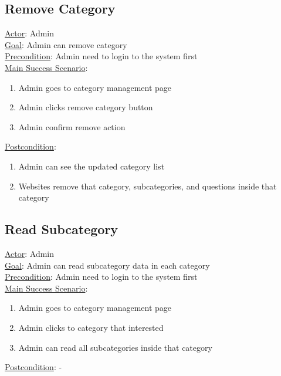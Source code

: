 \documentclass[12pt,oneside,openright,a4paper]{cpe-english-project}
\begin{document}
\subsection{Remove Category}
\underline{Actor}: Admin\\
\underline{Goal}: Admin can remove category\\
\underline{Precondition}: Admin need to login to the system first\\
\underline{Main Success Scenario}:
\begin{enumerate}[label={\arabic*.}]
	\item Admin goes to category management page
	\item Admin clicks remove category button
	\item Admin confirm remove action
\end{enumerate}
\underline{Postcondition}: 
\begin{enumerate}[label={\arabic*.}]
	\item Admin can see the updated category list
	\item Websites remove that category, subcategories, and questions inside that category
\end{enumerate}

\subsection{Read Subcategory}
\underline{Actor}: Admin\\
\underline{Goal}: Admin can read subcategory data in each category\\
\underline{Precondition}: Admin need to login to the system first\\
\underline{Main Success Scenario}:
\begin{enumerate}[label={\arabic*.}]
	\item Admin goes to category management page
	\item Admin clicks to category that interested
	\item Admin can read all subcategories inside that category
\end{enumerate}
\underline{Postcondition}: -
\end{document}
